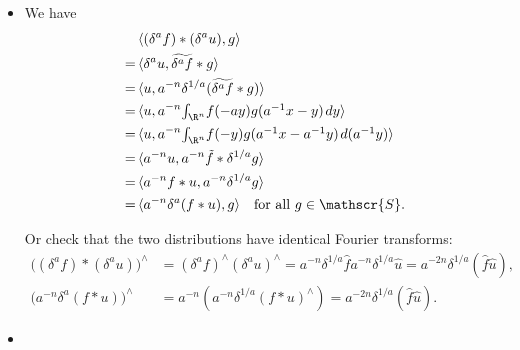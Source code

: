 \begin{itemize}
\item[2.3.3]
We have
\begin{align*}
    &\,\langle (\delta^a f)*(\delta^a u),g\rangle\\
    =&\,\langle \delta^a u,\widetilde{\delta^a f}*g\rangle\\
    =&\,\langle u,a^{-n}\delta^{1/a}(\widetilde{\delta^a f}*g)\rangle\\
    =&\,\langle u,a^{-n}\textstyle{\int_{\R^n}}f(-ay)g(a^{-1}x-y)\>dy\rangle\\
    =&\,\langle u,a^{-n}\textstyle{\int_{\R^n}}f(-y)g(a^{-1}x-a^{-1}y)\>d(a^{-1}y)\rangle\\
    =&\,\langle a^{-n}u,a^{-n}\tilde{f}*\delta^{1/a}g\rangle\\
    =&\,\langle a^{-n}f*u,a^{-n}\delta^{1/a}g\rangle\\
    =&\,\langle a^{-n}\delta^a(f*u),g\rangle \quad\textup{for all }g\in\mathscr{S}.
\end{align*}

Or check that the two distributions have identical Fourier transforms:
\begin{align*}
    \big((\delta^a f)*(\delta^a u)\big)^\wedge
    &=(\delta^a f)^\wedge(\delta^a u)^\wedge
    =a^{-n}\delta^{1/a}\hat{f}a^{-n}\delta^{1/a}\hat{u}
    =a^{-2n}\delta^{1/a}(\hat{f}\hat{u}),\\
    \big(a^{-n}\delta^a(f*u)\big)^\wedge
    &=a^{-n}(a^{-n}\delta^{1/a}(f*u)^\wedge)
    =a^{-2n}\delta^{1/a}(\hat{f}\hat{u}).
\end{align*}

\item[2.3.4]


\end{itemize}
